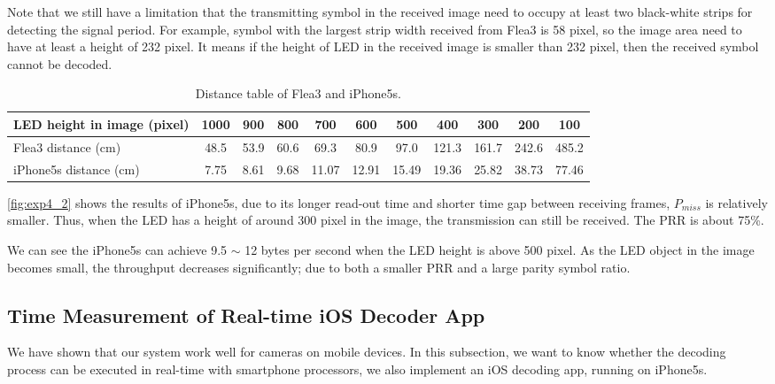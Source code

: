 Note that we still have a limitation that the transmitting symbol in the received image need to occupy at least two black-white strips for detecting the signal period. For example, symbol with the largest strip width received from Flea3 is 58 pixel, so the image area need to have at least a height of 232 pixel. It means if the height of LED in the received image is smaller than 232 pixel, then the received symbol cannot be decoded.

\begin{table}[!t]
\centering
\caption{Distance table of Flea3 and iPhone5s.}
  \hspace{-2em}
  \tabcolsep=0.11cm
  \begin{tabular}{lcccccccccc}
  \hline LED height in image (pixel) & 1000 & 900 & 800 & 700 & 600 & 500 & 400 & 300 & 200 & 100 \\
  \hline 
  \hline Flea3 distance (cm) & 48.5 & 53.9 &60.6& 69.3 &80.9& 97.0& 121.3 &161.7 &242.6 &485.2\\
  \hline iPhone5s distance (cm) & 7.75& 8.61& 9.68& 11.07& 12.91& 15.49& 19.36& 25.82& 38.73& 77.46 \\
  \end{tabular}
  \label{tab:comp_dis} 
\end{table}


\autoref{fig:exp4_2} shows the results of iPhone5s, due to its longer read-out time and shorter time gap between receiving frames, $P_{miss}$ is relatively smaller. Thus, when the LED has a height of around 300 pixel in the image, the transmission can still be received. The PRR is about 75\%.
 
 We can see the iPhone5s can achieve 9.5 $\sim$ 12 bytes per second when the LED height is above 500 pixel. As the LED object in the image becomes small, the throughput decreases significantly; due to both a smaller PRR and a large parity symbol ratio.


\subsection{Time Measurement of Real-time iOS Decoder App}
\label{sec:ios_eval}

We have shown that our system work well for cameras on mobile devices. In this subsection, we want to know whether the decoding process can be executed in real-time with smartphone processors, we also implement an iOS decoding app, running on iPhone5s.

